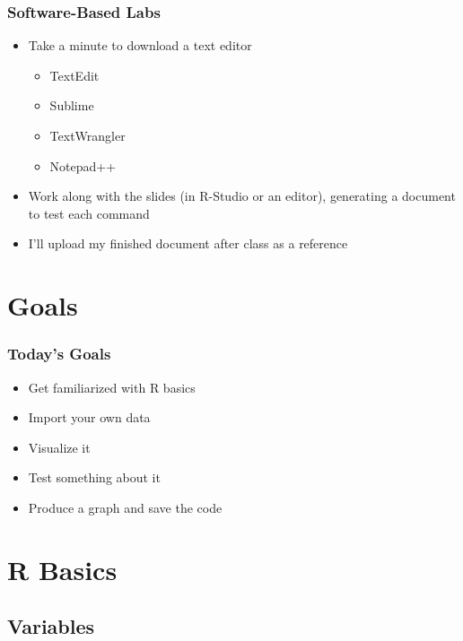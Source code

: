 \documentclass[14pt]{beamer}
\begin{document}
\begin{frame}
\frametitle{Software-Based Labs}
\begin{itemize}
	\item<+-> Take a minute to download a text editor
	\begin{itemize}
		\item TextEdit
		\item Sublime
		\item TextWrangler
		\item Notepad++
	\end{itemize}
	\item<+-> Work along with the slides (in R-Studio or an editor), generating a document to test each command
	\item<+-> I'll upload my finished document after class as a reference
\end{itemize}
\end{frame}

\section{Goals} %

\begin{frame}
\frametitle{Today's Goals}
\begin{itemize}
	\item Get familiarized with R basics
	\item Import your own data
	\item Visualize it
	\item Test something about it
	\item Produce a graph and save the code
\end{itemize}
\end{frame}

\section{R Basics}

\subsection{Variables}
\end{document}
